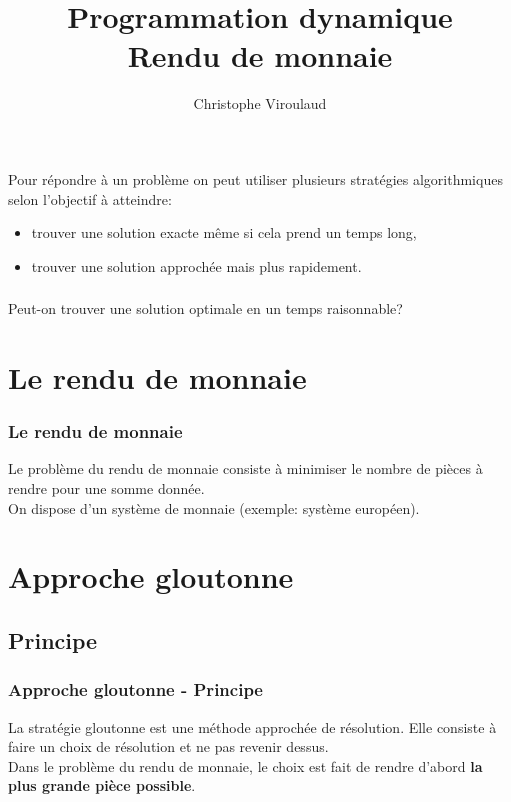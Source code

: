 \documentclass[svgnames,11pt]{beamer}
\author[]{Christophe Viroulaud}
\title{Programmation dynamique\\Rendu de monnaie}
\date{\framebox{\textbf{Algo 25}}}
\institute{Terminale - NSI}
\begin{document}
\begin{frame}
\titlepage
\end{frame}

\begin{frame}
    \frametitle{}
    Pour répondre à un problème on peut utiliser plusieurs stratégies algorithmiques selon l'objectif à atteindre:
    \begin{itemize}
        \item trouver une solution exacte même si cela prend un temps long,
        \item trouver une solution approchée mais plus rapidement.
    \end{itemize}


\end{frame}
\begin{frame}
    \frametitle{}

    \begin{framed}
        \centering Peut-on trouver une solution optimale en un temps raisonnable?
    \end{framed}

\end{frame}
\section{Le rendu de monnaie}
\begin{frame}
    \frametitle{Le rendu de monnaie}

    \begin{aretenir}[Définition]
        Le problème du rendu de monnaie consiste à minimiser le nombre de pièces à rendre pour une somme donnée.\\On dispose d'un système de monnaie (exemple: système européen).
    \end{aretenir}

\end{frame}
\section{Approche gloutonne}
\subsection{Principe}
\begin{frame}
    \frametitle{Approche gloutonne - Principe}

    \begin{aretenir}[]
    La stratégie gloutonne est une méthode approchée de résolution. Elle consiste à faire un choix de résolution et ne pas revenir dessus.\\
    Dans le problème du rendu de monnaie, le choix est fait de rendre d'abord \textbf{la plus grande pièce possible}.
    \end{aretenir}

\end{frame}
\end{document}
